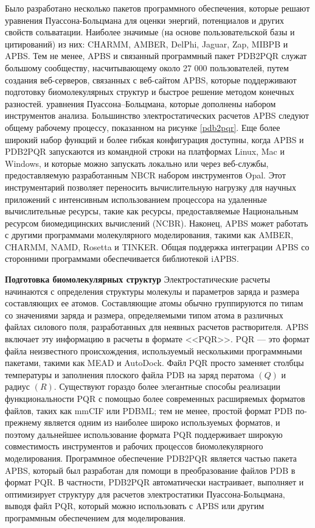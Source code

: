 Было разработано несколько пакетов программного обеспечения, которые решают уравнения Пуассона-Больцмана для оценки энергий, потенциалов и других свойств сольватации. Наиболее значимые (на основе пользовательской базы и цитирований) из них: CHARMM, AMBER, DelPhi, Jaguar, Zap, MIBPB и APBS. Тем не менее, APBS и связанный программный пакет PDB2PQR служат большому сообществу, насчитывающему около 27 000 пользователей, путем создания веб-серверов, связанных с веб-сайтом APBS, которые поддерживают подготовку биомолекулярных структур и быстрое решение методом конечных разностей. уравнения Пуассона–Больцмана, которые дополнены набором инструментов анализа. Большинство электростатических расчетов APBS следуют общему рабочему процессу, показанном на рисунке \ref{pdb2pqr}. Еще более широкий набор функций и более гибкая конфигурация доступны, когда APBS и PDB2PQR запускаются из командной строки на платформах Linux, Mac и Windows, и которые можно запускать локально или через веб-службы, предоставляемую разработанным NBCR набором инструментов Opal. Этот инструментарий позволяет переносить вычислительную нагрузку для научных приложений с интенсивным использованием процессора на удаленные вычислительные ресурсы, такие как ресурсы, предоставляемые Национальным ресурсом биомедицинских вычислений (NCBR). Наконец, APBS может работать с другими программами молекулярного моделирования, такими как AMBER, CHARMM, NAMD, Rosetta и TINKER. Общая поддержка интеграции APBS со сторонними программами обеспечивается библиотекой iAPBS.

\textbf{Подготовка биомолекулярных структур}
Электростатические расчеты начинаются с определения структуры молекулы и параметров заряда и размера составляющих ее атомов. Составляющие атомы обычно группируются по типам со значениями заряда и размера, определяемыми типом атома в различных файлах силового поля, разработанных для неявных расчетов растворителя. APBS включает эту информацию в расчеты в формате <<PQR>>. PQR — это формат файла неизвестного происхождения, используемый несколькими программными пакетами, такими как MEAD и AutoDock. Файл PQR просто заменяет столбцы температуры и заполнения плоского файла PDB на заряд ператома $(Q)$ и радиус $(R)$. Существуют гораздо более элегантные способы реализации функциональности PQR с помощью более современных расширяемых форматов файлов, таких как mmCIF или PDBML; тем не менее, простой формат PDB по-прежнему является одним из наиболее широко используемых форматов, и поэтому дальнейшее использование формата PQR поддерживает широкую совместимость инструментов и рабочих процессов биомолекулярного моделирования. Программное обеспечение PDB2PQR является частью пакета APBS, который был разработан для помощи в преобразование файлов PDB в формат PQR. В частности, PDB2PQR автоматически настраивает, выполняет и оптимизирует структуру для расчетов электростатики Пуассона-Больцмана, выводя файл PQR, который можно использовать с APBS или другим программным обеспечением для моделирования.

